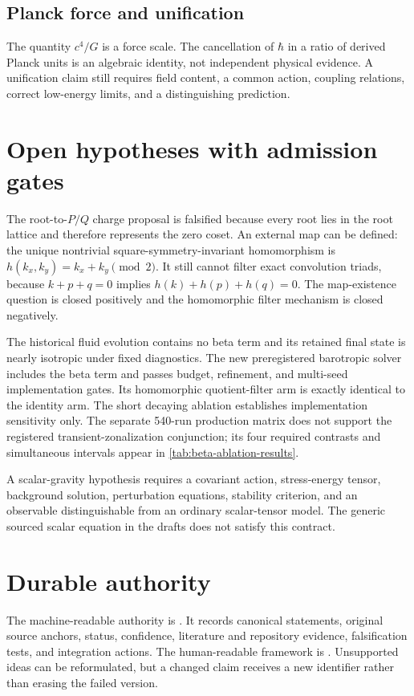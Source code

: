 \subsection{Planck force and unification}

The quantity $c^4/G$ is a force scale. The cancellation of $\hbar$ in a ratio
of derived Planck units is an algebraic identity, not independent physical
evidence. A unification claim still requires field content, a common action,
coupling relations, correct low-energy limits, and a distinguishing prediction.

\section{Open hypotheses with admission gates}

The root-to-$P/Q$ charge proposal is falsified because every root lies in the
root lattice and therefore represents the zero coset. An external map can be
defined: the unique nontrivial square-symmetry-invariant homomorphism is
$h(k_x,k_y)=k_x+k_y\pmod 2$. It still cannot filter exact convolution triads,
because $k+p+q=0$ implies $h(k)+h(p)+h(q)=0$. The map-existence question is
closed positively and the homomorphic filter mechanism is closed negatively.

The historical fluid evolution contains no beta term and its retained final
state is nearly isotropic under fixed diagnostics. The new preregistered
barotropic solver includes the beta term and passes budget, refinement, and
multi-seed implementation gates. Its homomorphic quotient-filter arm is exactly
identical to the identity arm. The short decaying ablation establishes
implementation sensitivity only. The separate 540-run production matrix does
not support the registered transient-zonalization conjunction; its four
required contrasts and simultaneous intervals appear in
\cref{tab:beta-ablation-results}.

A scalar-gravity hypothesis requires a covariant action, stress-energy tensor,
background solution, perturbation equations, stability criterion, and an
observable distinguishable from an ordinary scalar-tensor model. The generic
sourced scalar equation in the drafts does not satisfy this contract.

\section{Durable authority}

The machine-readable authority is
. It records canonical
statements, original source anchors, status, confidence, literature and
repository evidence, falsification tests, and integration actions. The
human-readable framework is
. Unsupported ideas can be
reformulated, but a changed claim receives a new identifier rather than erasing
the failed version.
